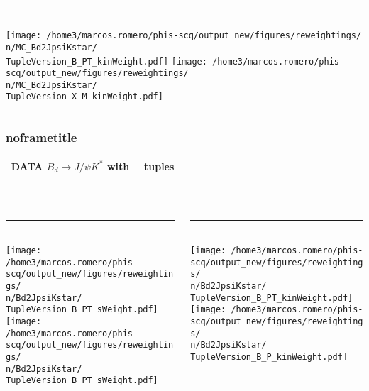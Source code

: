 {\begin{frame}
\begin{columns}[T]
\begin{column}{0.48\textwidth}
\\[-4mm]\rule{\columnwidth}{0.1mm}\\[1mm]
  \texttt{[image: /home3/marcos.romero/phis-scq/output\_new/figures/reweightings/\\n/MC\_Bd2JpsiKstar/\\TupleVersion\_B\_PT\_kinWeight.pdf]}
  \texttt{[image: /home3/marcos.romero/phis-scq/output\_new/figures/reweightings/\\n/MC\_Bd2JpsiKstar/\\TupleVersion\_X\_M\_kinWeight.pdf]}
\end{column}
\end{columns}
\end{frame} %
%
\begin{frame} %
\frametitle{noframetitle}
\framesubtitle{\n \, DATA $B_d\rightarrow J/\psi K^*$ with \, \TupleVersion\, tuples}
\vspace*{-0.2cm}
\begin{columns}[T]
\begin{column}{0.48\textwidth}
\\[-4mm]\rule{\columnwidth}{0.1mm}\\[1mm]
  \texttt{[image: /home3/marcos.romero/phis-scq/output\_new/figures/reweightings/\\n/Bd2JpsiKstar/\\TupleVersion\_B\_PT\_sWeight.pdf]}
  \texttt{[image: /home3/marcos.romero/phis-scq/output\_new/figures/reweightings/\\n/Bd2JpsiKstar/\\TupleVersion\_B\_PT\_sWeight.pdf]}
\end{column}
\begin{column}{0.48\textwidth}
\\[-4mm]\rule{\columnwidth}{0.1mm}\\[1mm]
  \texttt{[image: /home3/marcos.romero/phis-scq/output\_new/figures/reweightings/\\n/Bd2JpsiKstar/\\TupleVersion\_B\_PT\_kinWeight.pdf]}
  \texttt{[image: /home3/marcos.romero/phis-scq/output\_new/figures/reweightings/\\n/Bd2JpsiKstar/\\TupleVersion\_B\_P\_kinWeight.pdf]}
\end{column}
\end{columns}
\end{frame} %
%
}




